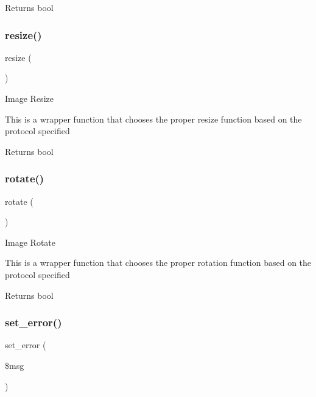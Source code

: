 \begin{DoxyReturn}{Returns}
bool 
\end{DoxyReturn}
\mbox{\label{class_c_i___image__lib_a94e38a7d478ce07200a52c51497e598e}} 
\subsubsection{\texorpdfstring{resize()}{resize()}}
{\footnotesize\ttfamily resize (\begin{DoxyParamCaption}{ }\end{DoxyParamCaption})}

Image Resize

This is a wrapper function that chooses the proper resize function based on the protocol specified

\begin{DoxyReturn}{Returns}
bool 
\end{DoxyReturn}
\mbox{\label{class_c_i___image__lib_a74e94d71195d9cbb9c9e3bca3353d912}} 
\subsubsection{\texorpdfstring{rotate()}{rotate()}}
{\footnotesize\ttfamily rotate (\begin{DoxyParamCaption}{ }\end{DoxyParamCaption})}

Image Rotate

This is a wrapper function that chooses the proper rotation function based on the protocol specified

\begin{DoxyReturn}{Returns}
bool 
\end{DoxyReturn}
\mbox{\label{class_c_i___image__lib_a892f1ba7cba3731a3fc68f1f64e92610}} 
\subsubsection{\texorpdfstring{set\+\_\+error()}{set\_error()}}
{\footnotesize\ttfamily set\+\_\+error (\begin{DoxyParamCaption}\item[{}]{\$msg }\end{DoxyParamCaption})}

